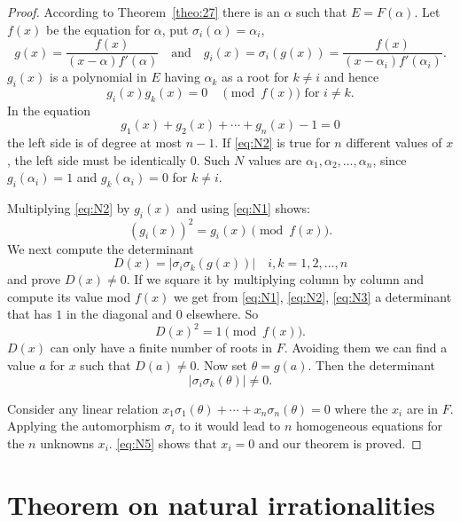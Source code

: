 \documentclass[10pt,leqno,a5paper]{book}
\theoremstyle{definition}
\let\htw\section
\begin{document}
\begin{proof}
According to Theorem~\ref{theo:27} there is an $\alpha$ such that $E = F(\alpha)$.
Let $f(x)$ be the equation for $\alpha$, put $\sigma_i(\alpha) = \alpha_i$,
\[
g(x) = \frac{f(x)}{(x{-}\alpha)f'(\alpha)}
\quad\text{and}\quad
g_i(x) = \sigma_i(g(x))
= \frac{f(x)}{(x {-} \alpha_i)f'(\alpha_i)}.
\]
$g_i(x)$ is a polynomial in $E$ having $\alpha_k$ as a root for $k\not= i$ and hence
\begin{equation}
\label{eq:N1}
g_i(x) g_k(x) = 0
\quad
\text{$\pmod{f(x)}$ for $i \not= k$}.
\end{equation}
In the equation
\begin{equation}
\label{eq:N2}
g_1(x) + g_2(x) + \cdots + g_n(x) - 1 = 0
\end{equation}
the left side is of degree at most $n-1$.
If \eqref{eq:N2} is true for $n$ different values of $x$, the left side must be identically $0$.
Such $N$ values are $\alpha_1, \alpha_2, \ldots, \alpha_n$, since $g_i(\alpha_i) = 1$ and $g_k(\alpha_i) = 0$ for $k \not= i$.

Multiplying \eqref{eq:N2} by $g_i(x)$ and using \eqref{eq:N1} shows:
\begin{equation}
\label{eq:N3}
(g_i(x))^2 = g_i(x) \pmod{f(x)}.
\end{equation}
We next compute the determinant
\begin{equation}
\label{eq:N4}
D(x) = |\sigma_i \sigma_k (g(x)) |
\quad
i,k = 1,2,\ldots,n
\end{equation}
and prove $D(x) \not= 0$.
If we square it by multiplying column by column and compute its value mod $f(x)$ we get from \eqref{eq:N1}, \eqref{eq:N2}, \eqref{eq:N3} a determinant that has $1$ in the diagonal and $0$ elsewhere.
So
\[
D(x)^2 = 1 \pmod{f(x)}.
\]
$D(x)$ can only have a finite number of roots in $F$.
Avoiding them we can find a value $a$ for $x$ such that $D(a) \not= 0$.
Now set $\theta = g(a)$.
Then the determinant
\begin{equation}
\label{eq:N5}
|\sigma_i \sigma_k (\theta) | \not= 0.
\end{equation}

Consider any linear relation $x_1 \sigma_1(\theta) + \cdots + x_n \sigma_n(\theta) = 0$ where the $x_i$ are in $F$.
Applying the automorphism $\sigma_i$ to it would lead to $n$ homogeneous equations for the $n$ unknowns $x_i$.
\eqref{eq:N5} shows that $x_i = 0$ and our theorem is proved.
\end{proof}


\htw{Theorem on natural irrationalities}
\end{document}
